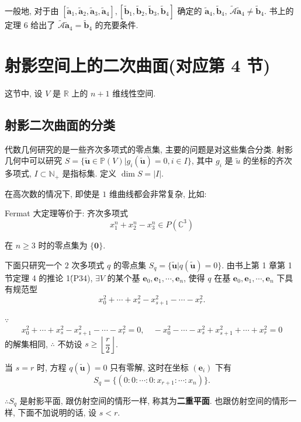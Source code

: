 \documentclass{ctexart}
\begin{document}
一般地, 对于由 $[\tilde{\boldsymbol{a}}_1,\tilde{\boldsymbol{a}}_2,\tilde{\boldsymbol{a}}_3,\tilde{\boldsymbol{a}}_4],[\tilde{\boldsymbol{b}}_1,\tilde{\boldsymbol{b}}_2,\tilde{\boldsymbol{b}}_3,\tilde{\boldsymbol{b}}_4]$ 确定的 $\tilde{\boldsymbol{a}}_4,\tilde{\boldsymbol{b}}_4$, $\widetilde{\mathcal{A}}\tilde{\boldsymbol{a}}_4\neq\tilde{\boldsymbol{b}}_4$. 书上的定理 6 给出了 $\widetilde{\mathcal{A}}\tilde{\boldsymbol{a}}_4=\tilde{\boldsymbol{b}}_4$ 的充要条件.
\section{射影空间上的二次曲面(对应第 4 节)}
这节中, 设 $V$ 是 $\mathbb{R}$ 上的 $n+1$ 维线性空间.
\subsection{射影二次曲面的分类}
代数几何研究的是一些齐次多项式的零点集, 主要的问题是对这些集合分类. 射影几何中可以研究 $S=\{\tilde{\boldsymbol{u}}\in\mathbb{P}(V)|g_i(\tilde{\boldsymbol{u}})=0,i\in I\}$, 其中 $g_i$ 是 $\tilde{u}$ 的坐标的齐次多项式, $I\subset\mathbb{N}_+$ 是指标集. 定义 $\dim S=|I|$.

在高次数的情况下, 即使是 $1$ 维曲线都会非常复杂, 比如:
\begin{example}
    Fermat 大定理等价于: 齐次多项式
    \[x_1^n+x_2^n-x_3^n\in P(\mathbb{C}^3)\]

    在 $n\geq3$ 时的零点集为 $\{\boldsymbol{0}\}$.
\end{example}

下面只研究一个 $2$ 次多项式 $q$ 的零点集 $S_q=\{\tilde{\boldsymbol{u}}|q(\tilde{\boldsymbol{u}})=0\}$. 由书上第 1 章第 1 节定理 4 的推论 1\'(P34), $\exists V$ 的某个基 $\boldsymbol{e}_0,\boldsymbol{e}_1,\cdots,\boldsymbol{e}_n$, 使得 $q$ 在基 $\boldsymbol{e}_0,\boldsymbol{e}_1,\cdots,\boldsymbol{e}_n$ 下具有规范型
\[x^2_0+\cdots+x^2_s-x^2_{s+1}-\cdots-x^2_r.\]

$\because$
\[x^2_0+\cdots+x^2_s-x^2_{s+1}-\cdots-x^2_r=0,\quad -x^2_0-\cdots-x^2_s+x^2_{s+1}+\cdots+x^2_r=0\]
的解集相同, $\therefore$ 不妨设 $s\geq\left\lfloor\dfrac{r}{2}\right\rfloor$.

当 $s=r$ 时, 方程 $q(\tilde{\boldsymbol{u}})=0$ 只有零解, 这时在坐标 $(\boldsymbol{e}_i)$ 下有
\[S_q=\{(0:0:\cdots:0:x_{r+1}:\cdots:x_n)\}.\]

$\therefore S_q$ 是射影平面, 跟仿射空间的情形一样, 称其为\textbf{二重平面}. 也跟仿射空间的情形一样, 下面不加说明的话, 设 $s<r$.
\end{document}
